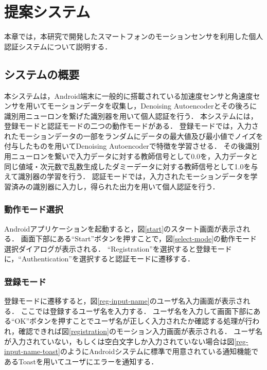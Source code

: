 \chapter{提案システム}
本章では，本研究で開発したスマートフォンのモーションセンサを利用した個人認証システムについて説明する．

\section{システムの概要}
本システムは，Android端末に一般的に搭載されている加速度センサと角速度センサを用いてモーションデータを収集し，Denoising Autoencoderとその後ろに識別用ニューロンを繋げた識別器を用いて個人認証を行う．
本システムには，登録モードと認証モードの二つの動作モードがある．
登録モードでは，入力されたモーションデータの一部をランダムにデータの最大値及び最小値でノイズを付与したものを用いてDenoising Autoencoderで特徴を学習させる．
その後識別用ニューロンを繋いで入力データに対する教師信号として0.0を，入力データと同じ値域・次元数で乱数生成したダミーデータに対する教師信号として1.0を与えて識別器の学習を行う．
認証モードでは，入力されたモーションデータを学習済みの識別器に入力し，得られた出力を用いて個人認証を行う．

\subsection{動作モード選択}
Androidアプリケーションを起動すると，図\ref{start}のスタート画面が表示される．
画面下部にある``Start''ボタンを押すことで，図\ref{select-mode}の動作モード選択ダイアログが表示される．
``Registration''を選択すると登録モードに，``Authentication''を選択すると認証モードに遷移する．

\subsection{登録モード}
登録モードに遷移すると，図\ref{reg-input-name}のユーザ名入力画面が表示される．
ここでは登録するユーザ名を入力する．
ユーザ名を入力して画面下部にある``OK''ボタンを押すことでユーザ名が正しく入力されたか確認する処理が行われ，確認できれば図\ref{registration}のモーション入力画面が表示される．
ユーザ名が入力されていない，もしくは空白文字しか入力されていない場合は図\ref{reg-input-name-toast}のようにAndroidシステムに標準で用意されている通知機能であるToastを用いてユーザにエラーを通知する．

